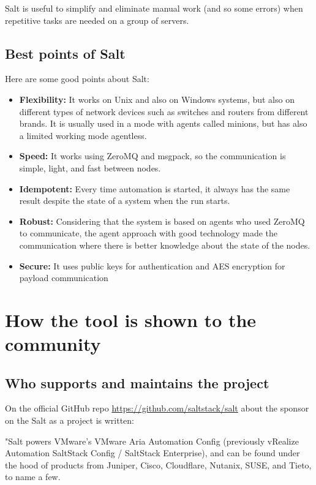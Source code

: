 \documentclass[12pt,a4paper,openright,twoside]{book}
\begin{document}
Salt is useful to simplify and eliminate manual work (and so some errors) when repetitive tasks are needed on a group of servers.

\subsection{Best points of Salt}

Here are some good points about Salt:
\begin{itemize}
    \item \textbf{Flexibility:} It works on Unix and also on Windows systems, but also on different types of network devices such as switches and routers from different brands.
                                It is usually used in a mode with agents called minions, but has also a limited working mode agentless.
    \item \textbf{Speed:} It works using ZeroMQ and msgpack, so the communication is simple, light, and fast between nodes.
    \item \textbf{Idempotent:} Every time automation is started, it always has the same result despite the state of a system when the run starts.
    \item \textbf{Robust:} Considering that the system is based on agents who used ZeroMQ to communicate, the agent approach with good technology made the communication where there is better knowledge about the state of the nodes.
    \item \textbf{Secure:} It uses public keys for authentication and AES encryption for payload communication
\end{itemize}

\section{How the tool is shown to the community}

\subsection{Who supports and maintains the project}
On the official GitHub repo \url{https://github.com/saltstack/salt} about the sponsor on the Salt as a project is written:


"Salt powers VMware's VMware Aria Automation Config (previously vRealize Automation SaltStack Config / SaltStack Enterprise), and can be found under the hood of products from Juniper, Cisco, Cloudflare, Nutanix, SUSE, and Tieto, to name a few.
\end{document}
